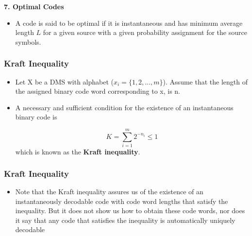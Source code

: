 \documentclass{beamer}
\begin{document}
\begin{frame}

\textbf{7. Optimal Codes}
\begin{itemize}
\item A code is said to be optimal if it is instantaneous and has minimum average length $L$ for a given
source with a given probability assignment for the source symbols.
\end{itemize}
\end{frame}
\begin{frame}
\frametitle{ Kraft Inequality}
\Large
\begin{itemize}
\item Let X be a DMS with alphabet ($x _i = \{1, 2, . . . ,m\}$). Assume that the length of the assigned binary
code word corresponding to x, is n.
\item A necessary and sufficient condition for the existence of an instantaneous binary code is

 \[ K = \sum^{m}_{i=1}2^{-n_i} \leq 1 \]
which is known as the \textbf{Kraft inequality}.
\end{itemize}
\end{frame}
\begin{frame}
\frametitle{ Kraft Inequality}
\Large
\begin{itemize}

\item Note that the Kraft inequality assures us of the existence of an instantaneously decodable code
with code word lengths that satisfy the inequality. But it does not show us how to obtain these code
words, nor does it say that any code that satisfies the inequality is automatically uniquely decodable
\end{itemize}
\end{frame}
\end{document}
